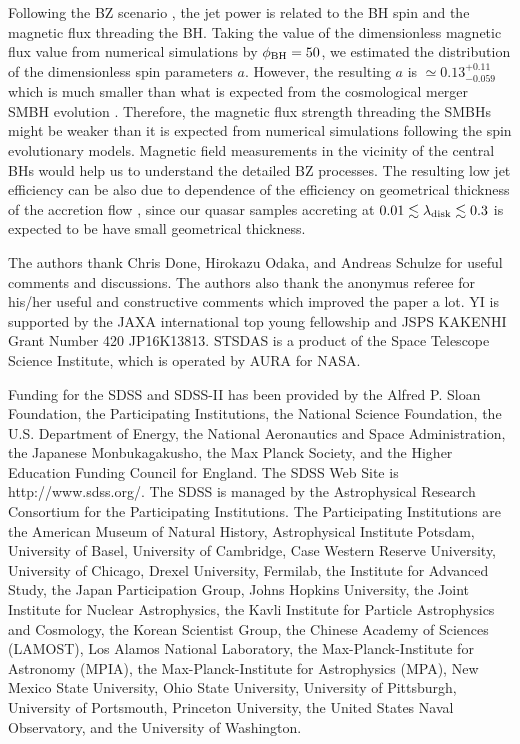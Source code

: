 \documentclass[preprint2,twocolappendix]{aastex6}
\begin{document}
Following the BZ scenario \citep{bla77}, the jet power is related to the BH spin and the magnetic flux threading the BH. Taking the value of the dimensionless magnetic flux value from numerical simulations by \citet{mck12} $\phi_{\rm BH}=50$, we estimated the distribution of the dimensionless spin parameters $a$. However, the resulting $a$ is $\simeq0.13_{-0.059}^{+0.11}$ which is much smaller than what is expected from the cosmological merger SMBH evolution \citep[e.g.,][]{vol13}. Therefore, the magnetic flux strength threading the SMBHs might be weaker than it is expected from numerical simulations following the spin evolutionary models. Magnetic field measurements in the vicinity of the central BHs would help us to understand the detailed BZ processes. The resulting low jet efficiency can be also due to dependence of the efficiency on geometrical thickness of the accretion flow \citep{ava16}, since our quasar samples accreting at $0.01 \lesssim \lambda_{\rm disk} \lesssim 0.3$ is expected to be have small geometrical thickness.

\bigskip
The authors thank Chris Done, Hirokazu Odaka, and Andreas Schulze for useful comments and discussions. The authors also thank the anonymus referee for his/her useful and constructive comments which improved the paper a lot. YI is supported by the JAXA international top young fellowship and JSPS KAKENHI Grant Number 420 JP16K13813. STSDAS is a product of the Space Telescope Science Institute, which is operated by AURA for NASA. 

Funding for the SDSS and SDSS-II has been provided by the Alfred P. Sloan Foundation, the Participating Institutions, the National Science Foundation, the U.S. Department of Energy, the National Aeronautics and Space Administration, the Japanese Monbukagakusho, the Max Planck Society, and the Higher Education Funding Council for England. The SDSS Web Site is http://www.sdss.org/. The SDSS is managed by the Astrophysical Research Consortium for the Participating Institutions. The Participating Institutions are the American Museum of Natural History, Astrophysical Institute Potsdam, University of Basel, University of Cambridge, Case Western Reserve University, University of Chicago, Drexel University, Fermilab, the Institute for Advanced Study, the Japan Participation Group, Johns Hopkins University, the Joint Institute for Nuclear Astrophysics, the Kavli Institute for Particle Astrophysics and Cosmology, the Korean Scientist Group, the Chinese Academy of Sciences (LAMOST), Los Alamos National Laboratory, the Max-Planck-Institute for Astronomy (MPIA), the Max-Planck-Institute for Astrophysics (MPA), New Mexico State University, Ohio State University, University of Pittsburgh, University of Portsmouth, Princeton University, the United States Naval Observatory, and the University of Washington.
\vspace{5mm}
\end{document}
